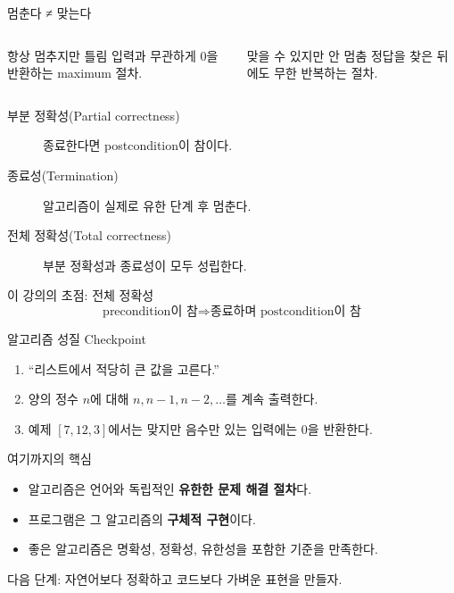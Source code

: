 \begin{frame}{멈춘다 ≠ 맞는다}
  \begin{columns}[T,onlytextwidth]
      \begin{alertblock}{항상 멈추지만 틀림}
        입력과 무관하게 0을 반환하는 maximum 절차.
      \end{alertblock}
      \begin{alertblock}{맞을 수 있지만 안 멈춤}
        정답을 찾은 뒤에도 무한 반복하는 절차.
      \end{alertblock}
  \end{columns}
  \begin{description}
    \item[부분 정확성(Partial correctness)] 종료한다면 postcondition이 참이다.
    \item[종료성(Termination)] 알고리즘이 실제로 유한 단계 후 멈춘다.
    \item[전체 정확성(Total correctness)] 부분 정확성과 종료성이 모두 성립한다.
  \end{description}
  \begin{block}{이 강의의 초점: 전체 정확성}
    \[
      \text{precondition이 참}
      \Longrightarrow \text{종료하며 postcondition이 참}
    \]
  \end{block}
\end{frame}

\begin{frame}{알고리즘 성질 Checkpoint}
  \begin{enumerate}
    \item ``리스트에서 적당히 큰 값을 고른다.''
    \item 양의 정수 $n$에 대해 $n,n-1,n-2,\ldots$를 계속 출력한다.
    \item 예제 $[7,12,3]$에서는 맞지만 음수만 있는 입력에는 0을 반환한다.
  \end{enumerate}
  \vfill
\end{frame}

\begin{frame}{여기까지의 핵심}
  \begin{takeaway}
    \begin{itemize}
      \item 알고리즘은 언어와 독립적인 \textbf{유한한 문제 해결 절차}다.
      \item 프로그램은 그 알고리즘의 \textbf{구체적 구현}이다.
      \item 좋은 알고리즘은 명확성, 정확성, 유한성을 포함한 기준을 만족한다.
    \end{itemize}
  \end{takeaway}
  다음 단계: 자연어보다 정확하고 코드보다 가벼운 표현을 만들자.
\end{frame}
